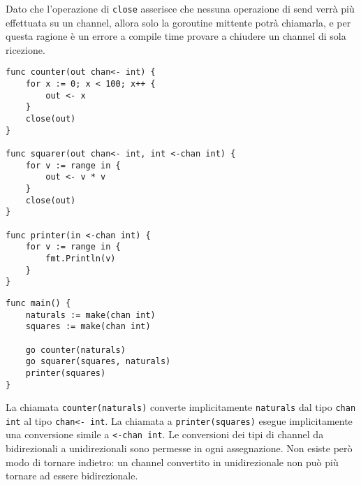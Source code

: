 \documentclass[../../../thesis.tex]{subfiles}
\begin{document}
    Dato che l'operazione di \verb"close" asserisce che nessuna operazione di send verrà più effettuata su un channel, allora solo la goroutine mittente potrà chiamarla, e per questa ragione è un errore a compile time provare a chiudere un channel di sola ricezione.
    \begin{lstlisting}[frame = single, label = {lst:lstlisting7-4-3.2}]
func counter(out chan<- int) {
    for x := 0; x < 100; x++ {
        out <- x
    }
    close(out)
}

func squarer(out chan<- int, int <-chan int) {
    for v := range in {
        out <- v * v
    }
    close(out)
}

func printer(in <-chan int) {
    for v := range in {
        fmt.Println(v)
    }
}
    \end{lstlisting}
    \clearpage
    \newpage
    \begin{lstlisting}[frame = single, label = {lst:lstlisting7-4-3.3}]
func main() {
    naturals := make(chan int)
    squares := make(chan int)

    go counter(naturals)
    go squarer(squares, naturals)
    printer(squares)
}
    \end{lstlisting}
    La chiamata \verb"counter(naturals)" converte implicitamente \verb"naturals" dal tipo \verb"chan int" al tipo \verb"chan<- int".
    La chiamata a \verb"printer(squares)" esegue implicitamente una conversione simile a \verb"<-chan int".
    Le conversioni dei tipi di channel da bidirezionali a unidirezionali sono permesse in ogni assegnazione.
    Non esiste però modo di tornare indietro: un channel convertito in unidirezionale non può più tornare ad essere bidirezionale.
\end{document}
